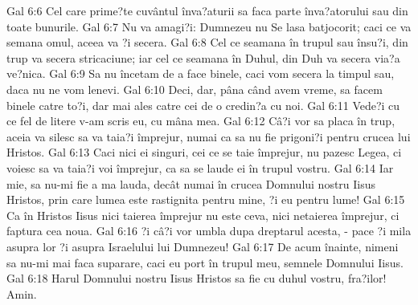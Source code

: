 Gal 6:6  Cel care prime?te cuvântul înva?aturii sa faca parte înva?atorului sau din toate bunurile.
Gal 6:7  Nu va amagi?i: Dumnezeu nu Se lasa batjocorit; caci ce va semana omul, aceea va ?i secera.
Gal 6:8  Cel ce seamana în trupul sau însu?i, din trup va secera stricaciune; iar cel ce seamana în Duhul, din Duh va secera via?a ve?nica.
Gal 6:9  Sa nu încetam de a face binele, caci vom secera la timpul sau, daca nu ne vom lenevi.
Gal 6:10  Deci, dar, pâna când avem vreme, sa facem binele catre to?i, dar mai ales catre cei de o credin?a cu noi.
Gal 6:11  Vede?i cu ce fel de litere v-am scris eu, cu mâna mea.
Gal 6:12  Câ?i vor sa placa în trup, aceia va silesc sa va taia?i împrejur, numai ca sa nu fie prigoni?i pentru crucea lui Hristos.
Gal 6:13  Caci nici ei singuri, cei ce se taie împrejur, nu pazesc Legea, ci voiesc sa va taia?i voi împrejur, ca sa se laude ei în trupul vostru.
Gal 6:14  Iar mie, sa nu-mi fie a ma lauda, decât numai în crucea Domnului nostru Iisus Hristos, prin care lumea este rastignita pentru mine, ?i eu pentru lume!
Gal 6:15  Ca în Hristos Iisus nici taierea împrejur nu este ceva, nici netaierea împrejur, ci faptura cea noua.
Gal 6:16  ?i câ?i vor umbla dupa dreptarul acesta, - pace ?i mila asupra lor ?i asupra Israelului lui Dumnezeu!
Gal 6:17  De acum înainte, nimeni sa nu-mi mai faca suparare, caci eu port în trupul meu, semnele Domnului Iisus.
Gal 6:18  Harul Domnului nostru Iisus Hristos sa fie cu duhul vostru, fra?ilor! Amin.


